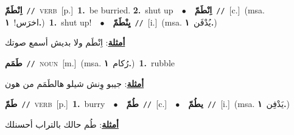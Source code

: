 \documentclass[10pt,a4paper,twoside]{article} %
\begin{document}
\begin{multicols}{2}
{\setlength\topsep{0pt}\textbf{\foreignlanguage{arabic}{اِنْطَمّ}}\ {\color{gray}\texttt{//}\color{black}}\ \textsc{verb}\ [p.]\ \textbf{1.}~be burried.  \textbf{2.}~shut up\ \ $\bullet$\ \ \setlength\topsep{0pt}\textbf{\foreignlanguage{arabic}{اِنْطَمّ}}\ {\color{gray}\texttt{//}\color{black}}\ [c.]\ \color{gray}(msa. \foreignlanguage{arabic}{اخرَس!}~\foreignlanguage{arabic}{\textbf{١.}})\color{black}\ \textbf{1.}~shut up!\ \ $\bullet$\ \ \setlength\topsep{0pt}\textbf{\foreignlanguage{arabic}{يِنْطَمّ}}\ {\color{gray}\texttt{//}\color{black}}\ [i.]\ \color{gray}(msa. \foreignlanguage{arabic}{يُدْفَن}~\foreignlanguage{arabic}{\textbf{١.}})\color{black}\  \begin{flushright}\color{gray}\foreignlanguage{arabic}{\textbf{\underline{\foreignlanguage{arabic}{أمثلة}}}: اِنْطَم ولا بديش أسمع صوتك}\end{flushright}\color{black}} \vspace{2mm}

{\setlength\topsep{0pt}\textbf{\foreignlanguage{arabic}{طَمَم}}\ {\color{gray}\texttt{//}\color{black}}\ \textsc{noun}\ [m.]\ \color{gray}(msa. \foreignlanguage{arabic}{رُكام}~\foreignlanguage{arabic}{\textbf{١.}})\color{black}\ \textbf{1.}~rubble\  \begin{flushright}\color{gray}\foreignlanguage{arabic}{\textbf{\underline{\foreignlanguage{arabic}{أمثلة}}}: جيبو وِنش شيلو هالطَمَم من هون}\end{flushright}\color{black}} \vspace{2mm}

{\setlength\topsep{0pt}\textbf{\foreignlanguage{arabic}{طَمّ}}\ {\color{gray}\texttt{//}\color{black}}\ \textsc{verb}\ [p.]\ \textbf{1.}~burry\ \ $\bullet$\ \ \setlength\topsep{0pt}\textbf{\foreignlanguage{arabic}{طُمّ}}\ {\color{gray}\texttt{//}\color{black}}\ [c.]\ \ $\bullet$\ \ \setlength\topsep{0pt}\textbf{\foreignlanguage{arabic}{يطُمّ}}\ {\color{gray}\texttt{//}\color{black}}\ [i.]\ \color{gray}(msa. \foreignlanguage{arabic}{يَدْفِن}~\foreignlanguage{arabic}{\textbf{١.}})\color{black}\  \begin{flushright}\color{gray}\foreignlanguage{arabic}{\textbf{\underline{\foreignlanguage{arabic}{أمثلة}}}: طُم حالك بالتراب أحسنلك}\end{flushright}\color{black}} \vspace{2mm}


\end{multicols}
\end{document}
